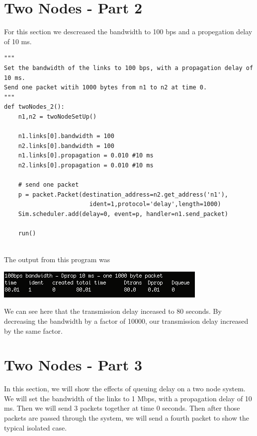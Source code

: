 \documentclass[11pt]{article}
\begin{document}
\section{Two Nodes - Part 2}

For this section we descreased the bandwidth to 100 bps and a propegation delay of 10 ms. 

\begin{lstlisting}
"""
Set the bandwidth of the links to 100 bps, with a propagation delay of 10 ms. 
Send one packet witih 1000 bytes from n1 to n2 at time 0.
"""
def twoNodes_2():
    n1,n2 = twoNodeSetUp()

    n1.links[0].bandwidth = 100
    n2.links[0].bandwidth = 100
    n1.links[0].propagation = 0.010 #10 ms
    n2.links[0].propagation = 0.010 #10 ms

    # send one packet
    p = packet.Packet(destination_address=n2.get_address('n1'),
                        ident=1,protocol='delay',length=1000)
    Sim.scheduler.add(delay=0, event=p, handler=n1.send_packet)

    run()


\end{lstlisting}
The output from this program was

\includegraphics{twoNode-2.png}

We can see here that the transmission delay inceased to 80 seconds. By decreasing the bandwidth by a factor of 10000, our transmission delay increased by the same factor. 

\section{Two Nodes - Part 3}

In this section, we will show the effects of queuing delay on a two node system. We will set the bandwidth of the links to 1 Mbps, with a propagation delay of 10 ms. Then we will send 3 packets together at time 0 seconds. Then after those packets are passed through the system, we will send a fourth packet to show the typical isolated case.
\end{document}
